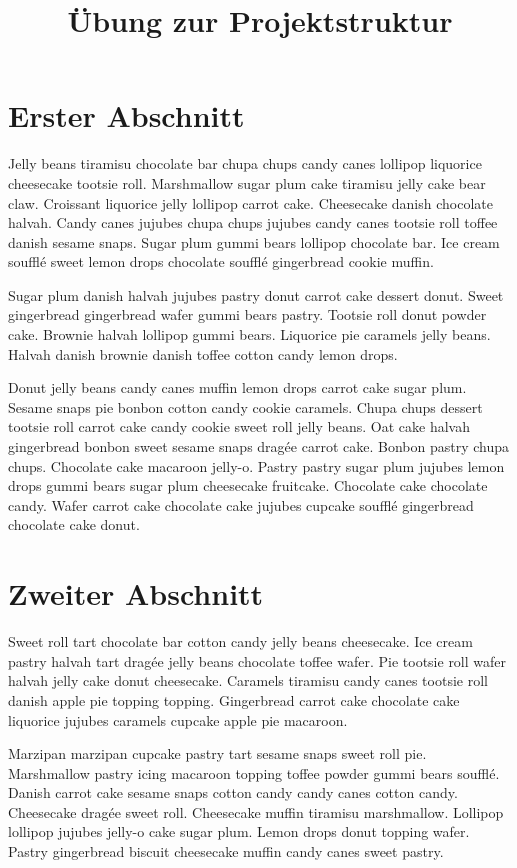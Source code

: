 \documentclass{article}
\title{Übung zur Projektstruktur}
\begin{document}
\maketitle
\tableofcontents

\newpage
\section{Erster Abschnitt}
Jelly beans tiramisu chocolate bar chupa chups candy canes lollipop liquorice cheesecake tootsie roll. Marshmallow sugar plum cake tiramisu jelly cake bear claw. Croissant liquorice jelly lollipop carrot cake. Cheesecake danish chocolate halvah. Candy canes jujubes chupa chups jujubes candy canes tootsie roll toffee danish sesame snaps. Sugar plum gummi bears lollipop chocolate bar. Ice cream soufflé sweet lemon drops chocolate soufflé gingerbread cookie muffin.

Sugar plum danish halvah jujubes pastry donut carrot cake dessert donut. Sweet gingerbread gingerbread wafer gummi bears pastry. Tootsie roll donut powder cake. Brownie halvah lollipop gummi bears. Liquorice pie caramels jelly beans. Halvah danish brownie danish toffee cotton candy lemon drops.

Donut jelly beans candy canes muffin lemon drops carrot cake sugar plum. Sesame snaps pie bonbon cotton candy cookie caramels. Chupa chups dessert tootsie roll carrot cake candy cookie sweet roll jelly beans. Oat cake halvah gingerbread bonbon sweet sesame snaps dragée carrot cake. Bonbon pastry chupa chups. Chocolate cake macaroon jelly-o. Pastry pastry sugar plum jujubes lemon drops gummi bears sugar plum cheesecake fruitcake. Chocolate cake chocolate candy. Wafer carrot cake chocolate cake jujubes cupcake soufflé gingerbread chocolate cake donut.

\newpage
\section{Zweiter Abschnitt}

Sweet roll tart chocolate bar cotton candy jelly beans cheesecake. Ice cream pastry halvah tart dragée jelly beans chocolate toffee wafer. Pie tootsie roll wafer halvah jelly cake donut cheesecake. Caramels tiramisu candy canes tootsie roll danish apple pie topping topping. Gingerbread carrot cake chocolate cake liquorice jujubes caramels cupcake apple pie macaroon.

Marzipan marzipan cupcake pastry tart sesame snaps sweet roll pie. Marshmallow pastry icing macaroon topping toffee powder gummi bears soufflé. Danish carrot cake sesame snaps cotton candy candy canes cotton candy. Cheesecake dragée sweet roll. Cheesecake muffin tiramisu marshmallow. Lollipop lollipop jujubes jelly-o cake sugar plum. Lemon drops donut topping wafer. Pastry gingerbread biscuit cheesecake muffin candy canes sweet pastry. 
\end{document}

